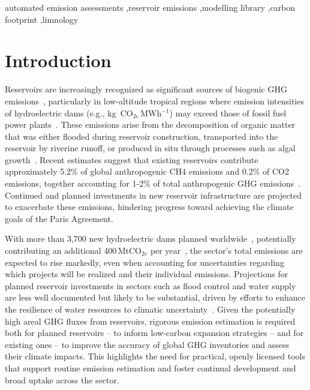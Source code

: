 \documentclass[review, authoryear, 1p]{elsarticle} %
\begin{document}
\begin{frontmatter}
\begin{keyword}
automated emission assessments \sep reservoir emissions \sep modelling library \sep carbon footprint \sep limnology
\end{keyword}

\end{frontmatter}

\section{Introduction}
\label{sec:introduction}

Reservoirs are increasingly recognized as significant sources of biogenic \ac{GHG} emissions~\citep{Barros2011}, particularly in low-altitude tropical regions where emission intensities of hydroelectric dams (e.g., kg~CO$_{2e}$\,MWh$^{-1}$) may exceed those of fossil fuel power plants~\citep{Fearnside2002}. 
These emissions arise from the decomposition of organic matter that was either flooded during reservoir construction, transported into the reservoir by riverine runoff, or produced in situ through processes such as algal growth~\citep{Louis2000}.
Recent estimates suggest that existing reservoirs contribute approximately 5.2\% of global anthropogenic \ac{CH4} emissions and 0.2\% of \ac{CO2} emissions, together accounting for 1-2\% of total anthropogenic \ac{GHG} emissions~\citep{Soued2022}.
Continued and planned investments in new reservoir infrastructure are projected to exacerbate these emissions, hindering progress toward achieving the climate goals of the Paris Agreement.

With more than 3,700 new hydroelectric dams planned worldwide~\citep{Zarfl2015}, potentially contributing an additional 400\,MtCO$_{2e}$ per year~\citep{janus2025planning}, the sector’s total emissions are expected to rise markedly, even when accounting for uncertainties regarding which projects will be realized and their individual emissions.
Projections for planned reservoir investments in sectors such as flood control and water supply are less well documented but likely to be substantial, driven by efforts to enhance the resilience of water resources to climatic uncertainty~\citep{ipcc2018, Sarkodie2022}.
Given the potentially high areal \ac{GHG} fluxes from reservoirs, rigorous emission estimation is required both for planned reservoirs -- to inform low-carbon expansion strategies -- and for existing ones -- to improve the accuracy of global \ac{GHG} inventories and assess their climate impacts.
This highlights the need for practical, openly licensed tools that support routine emission estimation and foster continual development and broad uptake across the sector.
\end{document}
